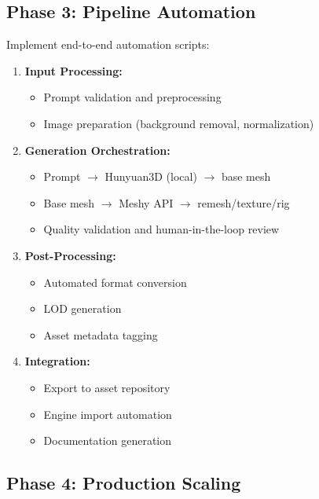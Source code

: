 \documentclass[11pt]{article}
\begin{document}
\subsection{Phase 3: Pipeline Automation}

Implement end-to-end automation scripts:

\begin{enumerate}[leftmargin=2em]
  \item \textbf{Input Processing:}
    \begin{itemize}
      \item Prompt validation and preprocessing
      \item Image preparation (background removal, normalization)
    \end{itemize}

  \item \textbf{Generation Orchestration:}
    \begin{itemize}
      \item Prompt $\rightarrow$ Hunyuan3D (local) $\rightarrow$ base mesh
      \item Base mesh $\rightarrow$ Meshy API $\rightarrow$ remesh/texture/rig
      \item Quality validation and human-in-the-loop review
    \end{itemize}

  \item \textbf{Post-Processing:}
    \begin{itemize}
      \item Automated format conversion
      \item LOD generation
      \item Asset metadata tagging
    \end{itemize}

  \item \textbf{Integration:}
    \begin{itemize}
      \item Export to asset repository
      \item Engine import automation
      \item Documentation generation
    \end{itemize}
\end{enumerate}

\subsection{Phase 4: Production Scaling}
\end{document}
